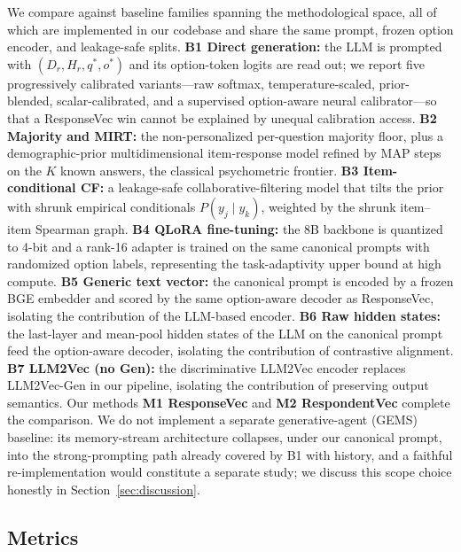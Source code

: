 We compare against baseline families spanning the methodological space, all of which are implemented in our codebase and share the same prompt, frozen option encoder, and leakage-safe splits. \textbf{B1 Direct generation:} the LLM is prompted with $(D_r, H_r, q^\ast, o^\ast)$ and its option-token logits are read out; we report five progressively calibrated variants---raw softmax, temperature-scaled, prior-blended, scalar-calibrated, and a supervised option-aware neural calibrator---so that a ResponseVec win cannot be explained by unequal calibration access. \textbf{B2 Majority and MIRT:} the non-personalized per-question majority floor, plus a demographic-prior multidimensional item-response model refined by MAP steps on the $K$ known answers, the classical psychometric frontier. \textbf{B3 Item-conditional CF:} a leakage-safe collaborative-filtering model that tilts the prior with shrunk empirical conditionals $P(y_j\mid y_k)$, weighted by the shrunk item--item Spearman graph. \textbf{B4 QLoRA fine-tuning:} the 8B backbone is quantized to 4-bit and a rank-16 adapter is trained on the same canonical prompts with randomized option labels, representing the task-adaptivity upper bound at high compute. \textbf{B5 Generic text vector:} the canonical prompt is encoded by a frozen BGE embedder and scored by the same option-aware decoder as ResponseVec, isolating the contribution of the LLM-based encoder. \textbf{B6 Raw hidden states:} the last-layer and mean-pool hidden states of the LLM on the canonical prompt feed the option-aware decoder, isolating the contribution of contrastive alignment. \textbf{B7 LLM2Vec (no Gen):} the discriminative LLM2Vec encoder replaces LLM2Vec-Gen in our pipeline, isolating the contribution of preserving output semantics. Our methods \textbf{M1 ResponseVec} and \textbf{M2 RespondentVec} complete the comparison. We do not implement a separate generative-agent (GEMS) baseline: its memory-stream architecture collapses, under our canonical prompt, into the strong-prompting path already covered by B1 with history, and a faithful re-implementation would constitute a separate study; we discuss this scope choice honestly in Section~\ref{sec:discussion}.

\subsection{Metrics}
\label{sec:metrics}

